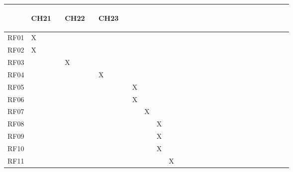\begin{table}[htb]
\begin{tabular}{|l|l|l|l|l|l|l|l|l|l|l|l|l|l|l|l|l|l|l|l|l|l|l|l|}
& \begin{turn}{90}CH21 \ \end{turn} & \begin{turn}{90}CH22 \ \end{turn} & \begin{turn}{90}CH23 \ \end{turn} \\ \hline
RF01&   X   &      &      &      &      &      &      &      &      &      &      &      &      &      &      &      &      &      &      &      &      &      &      \\ \hline
RF02&   X  &      &      &      &      &      &      &      &      &      &      &      &      &      &      &      &      &      &      &      &      &      &      \\ \hline
RF03&      &   X   &      &      &      &      &      &      &      &      &      &      &      &      &      &      &      &      &      &      &      &      &      \\ \hline
RF04&      &      &   X   &      &      &      &      &      &      &      &      &      &      &      &      &      &      &      &      &      &      &      &      \\ \hline
RF05&      &      &      &   X   &      &      &      &      &      &      &      &      &      &      &      &      &      &      &      &      &      &      &      \\ \hline
RF06&      &      &      &   X   &      &      &      &      &      &      &      &      &      &      &      &      &      &      &      &      &      &      &      \\ \hline
RF07&      &      &      &      &   X   &      &      &      &      &      &      &      &      &      &      &      &      &      &      &      &      &      &      \\ \hline
RF08&      &      &      &      &      &    X  &      &      &      &      &      &      &      &      &      &      &      &      &      &      &      &      &      \\ \hline
RF09&      &      &      &      &      &    X  &      &      &      &      &      &      &      &      &      &      &      &      &      &      &      &      &      \\ \hline
RF10&      &      &      &      &      &    X  &      &      &      &      &      &      &      &      &      &      &      &      &      &      &      &      &      \\ \hline
RF11&      &      &      &      &      &      &   X   &      &      &      &      &      &      &      &      &      &      &      &      &      &      &      &      \\ \hline

\end{tabular}
\end{table}
